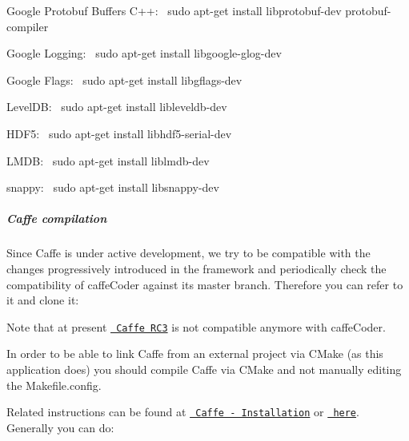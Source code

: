 Google Protobuf Buffers C++\+:~\newline
 {\ttfamily sudo apt-\/get install libprotobuf-\/dev protobuf-\/compiler}

Google Logging\+:~\newline
 {\ttfamily sudo apt-\/get install libgoogle-\/glog-\/dev}

Google Flags\+:~\newline
 {\ttfamily sudo apt-\/get install libgflags-\/dev}

Level\+DB\+:~\newline
 {\ttfamily sudo apt-\/get install libleveldb-\/dev}

H\+D\+F5\+:~\newline
 {\ttfamily sudo apt-\/get install libhdf5-\/serial-\/dev}

L\+M\+DB\+:~\newline
 {\ttfamily sudo apt-\/get install liblmdb-\/dev}

snappy\+:~\newline
 {\ttfamily sudo apt-\/get install libsnappy-\/dev}

\subparagraph*{Caffe compilation}

Since Caffe is under active development, we try to be compatible with the changes progressively introduced in the framework and periodically check the compatibility of {\ttfamily caffe\+Coder} against its {\ttfamily master} branch. Therefore you can refer to it and clone it\+:


\begin{DoxyCode}{0}
\end{DoxyCode}


Note that at present \href{https://github.com/BVLC/caffe/releases}{\texttt{ Caffe R\+C3}} is not compatible anymore with {\ttfamily caffe\+Coder}.

In order to be able to link Caffe from an external project via C\+Make (as this application does) you should compile Caffe via C\+Make and not manually editing the Makefile.\+config.

Related instructions can be found at \href{http://caffe.berkeleyvision.org/installation.html}{\texttt{ Caffe -\/ Installation}} or \href{https://github.com/BVLC/caffe/pull/1667}{\texttt{ here}}. Generally you can do\+:


\begin{DoxyCode}{0}
\end{DoxyCode}


